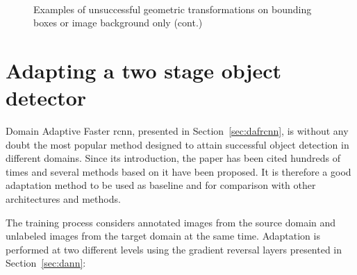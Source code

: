 \documentclass[%
    corpo=12pt,
    twoside,
    stile=classica,   
    tipotesi=magistrale,
    evenboxes,
    english,
	numerazioneromana,
]{toptesi}
\begin{document}
\begin{figure}[ht]\ContinuedFloat
	\centering
	\\
	\caption{Examples of unsuccessful geometric transformations on bounding boxes or image background only (cont.)}
	\label{fig:badaugs}
\end{figure}

\section{Adapting a two stage object detector}
Domain Adaptive Faster \acrshort{rcnn}\cite{chen2018domain}, presented in Section~\ref{sec:dafrcnn}, is without any doubt the most popular method designed to attain successful object detection in different domains. Since its introduction, the paper has been cited hundreds of times and several methods based on it have been proposed. It is therefore a good adaptation method to be used as baseline and for comparison with other architectures and methods.

The training process considers annotated images from the source domain and unlabeled images from the target domain at the same time. Adaptation is performed at two different levels  using the gradient reversal layers presented in Section~\ref{sec:dann}:
\end{document}
